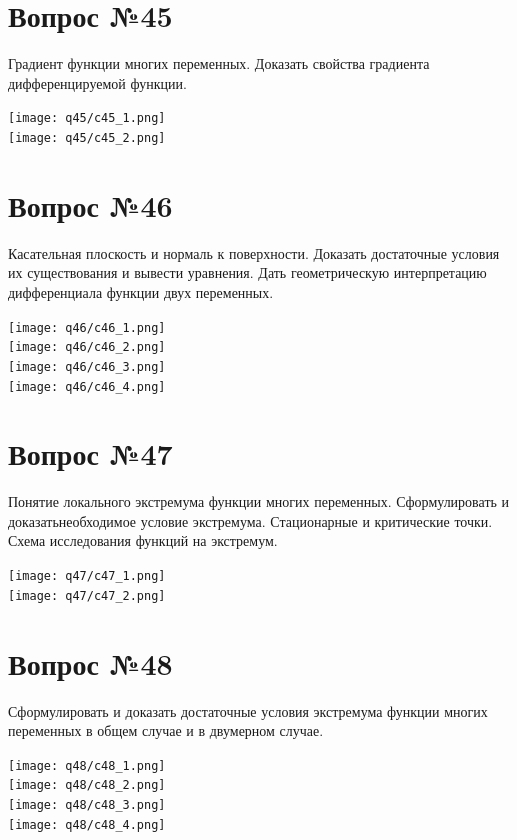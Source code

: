\documentclass[12pt]{report}
\numberwithin{equation}{section}
\begin{document}
\newpage \section{Вопрос №45} 
\begin{framed}
Градиент функции многих переменных. Доказать свойства градиента дифференцируемой функции.
\end{framed}\begin{center}
\texttt{[image: q45/c45\_1.png]}\\
\texttt{[image: q45/c45\_2.png]}\\
\end{center}



\newpage \section{Вопрос №46} 
\begin{framed}
Касательная плоскость и нормаль к поверхности. Доказать достаточные условия их существования и вывести уравнения. Дать геометрическую интерпретацию дифференциала функции двух переменных.
\end{framed}\begin{center}
\texttt{[image: q46/c46\_1.png]}\\
\texttt{[image: q46/c46\_2.png]}\\
\texttt{[image: q46/c46\_3.png]}\\
\texttt{[image: q46/c46\_4.png]}\\
\end{center}


\newpage \section{Вопрос №47} 
\begin{framed}
Понятие локального экстремума функции многих переменных. Сформулировать и доказатьнеобходимое условие экстремума. Стационарные и критические точки. Схема исследования функций на экстремум.
\end{framed}\begin{center}
\texttt{[image: q47/c47\_1.png]}\\
\texttt{[image: q47/c47\_2.png]}\\
\end{center}


\newpage \section{Вопрос №48} 
\begin{framed}
Сформулировать и доказать достаточные условия экстремума функции многих переменных в общем случае и в двумерном случае.
\end{framed}\begin{center}
\texttt{[image: q48/c48\_1.png]}\\
\texttt{[image: q48/c48\_2.png]}\\
\texttt{[image: q48/c48\_3.png]}\\
\texttt{[image: q48/c48\_4.png]}\\
\end{center}
\end{document}
